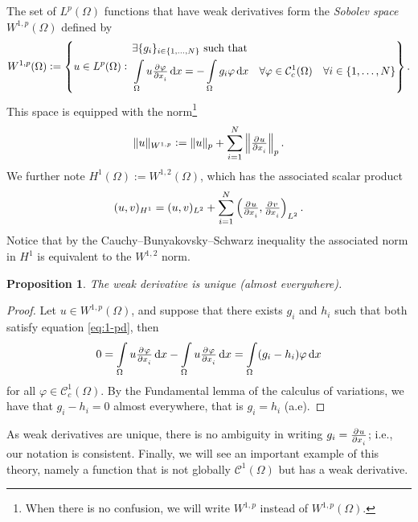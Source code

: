 \documentclass[a4paper,doc,11pt]{article}
\newtheorem{proposition}{Proposition}[theorem]
\newcommand{\CC}{\mathcal{C}}
\begin{document}
The set of \(L^p (\Omega)\) functions that have weak derivatives form the \emph{Sobolev space} \( W^{1,p} (\Omega)\) defined by
\[
    W^{1,p} (\Omega) :=
    \left\{
        u \in L^p (\Omega): \,
        \begin{aligned}
        &\exists \{g_i\}_{i\in \{1,\ldots, N\}} \text{ such that } 
        \\
        &\int\limits_\Omega u \pd{\varphi}{x_i} \dif x = -\int\limits_\Omega g_i \varphi \dif x \quad \forall \varphi \in \CC_c^1 (\Omega) \quad \forall i \in \{1,\ldots,N\}
        \end{aligned}
    \right\}.
\]
This space is equipped with the norm\footnote{When there is no confusion, we will write \(W^{1,p}\) instead of \(W^{1,p} (\Omega)\).}
\[
    \|u\|_{W^{1,p}} :=  \|u\|_p + \sum_{i=1}^N \left\| \pd{u}{x_i} \right\|_p.
\]
We further note \(H^1(\Omega) := W^{1,2}(\Omega)\), which has the associated scalar product
\[
    (u,v)_{H^1} = (u,v)_{L^2} + \sum_{i=1}^N \left( \pd{u}{x_i} , \pd{v}{x_i} \right)_{L^2}.
\]
Notice that by the Cauchy–Bunyakovsky–Schwarz inequality the associated norm in  \(H^1\) is equivalent to the \(W^{1,2}\) norm.

\begin{proposition}
    The weak derivative is unique (almost everywhere).
\end{proposition}
\begin{proof}
    Let \(u \in W^{1,p}(\Omega)\), and suppose that there exists \(g_i\) and \( h_i\) such that both satisfy equation \eqref{eq:1-pd}, then
    \[
        0 = \int\limits_\Omega u \pd{\varphi}{x_i} \dif x - \int\limits_\Omega u \pd{\varphi}{x_i} \dif x = \int\limits_\Omega (g_i - h_i) \varphi \dif x
    \]
    for all \(\varphi \in \CC_c^1 (\Omega)\). By the Fundamental lemma of the calculus of variations, we have that \( g_i - h_i = 0\) almost everywhere, that is \( g_i = h_i\) (a.e).
\end{proof}

As weak derivatives are unique, there is no ambiguity in writing \(g_i = \pd{u}{x_i}\); i.e., our notation is consistent. Finally, we will see an important example of this theory, namely a function that is not globally \(\CC^1(\Omega)\) but has a weak derivative.
\end{document}
